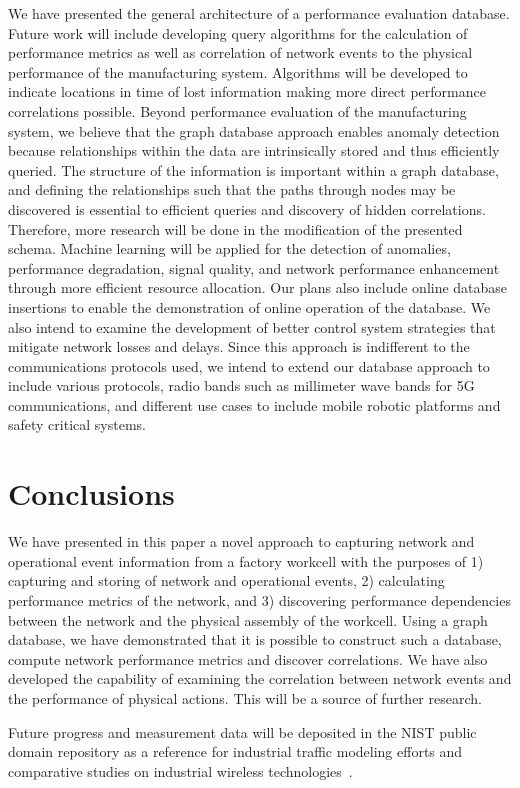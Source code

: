 We have presented the general architecture of a performance evaluation database.  Future work will include developing query algorithms for the calculation of performance metrics as well as correlation of network events to the physical performance of the manufacturing system.  Algorithms will be developed to indicate locations in time of lost information making more direct performance correlations possible.  Beyond performance evaluation of the manufacturing system, we believe that the graph database approach enables anomaly detection because relationships within the data are intrinsically stored and thus efficiently queried.  The structure of the information is important within a graph database, and defining the relationships such that the paths through nodes may be discovered is essential to efficient queries and discovery of hidden correlations.  Therefore, more research will be done in the modification of the presented schema.  Machine learning will be applied for the detection of anomalies, performance degradation, signal quality, and network performance enhancement through more efficient resource allocation.  Our plans also include online database insertions to enable the demonstration of online operation of the database.   We also intend to examine the development of better control system strategies that mitigate network losses and delays.  Since this approach is indifferent to the communications  protocols used, we intend to extend our database approach to include various protocols, radio bands such as millimeter wave bands for 5G communications, and different use cases to include mobile robotic platforms and safety critical systems.

\section{Conclusions} \label{gdbappl:sec::conclusion}
We have presented in this paper a novel approach to capturing network and operational event information from a factory workcell with the  purposes of 1) capturing and storing of network and operational events, 2) calculating performance metrics of the network, and 3) discovering performance dependencies between the network and the physical assembly of the workcell.  Using a graph database, we have demonstrated that it is possible to construct such a database, compute network performance metrics and discover correlations.  We have also developed the capability of examining the correlation between network events and the performance of physical actions.  This will be a source of further research.

Future progress and measurement data will be deposited in the NIST public domain repository as a reference for industrial traffic modeling efforts and comparative studies on industrial wireless technologies~\cite{Candell2019PROJECTURL}.




